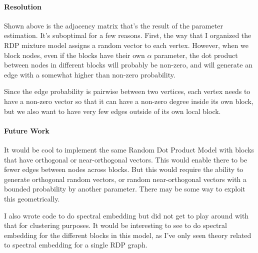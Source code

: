 \documentclass[12pt]{article}
\begin{document}
\paragraph{Resolution}
Shown above is the adjacency matrix that's the result of the parameter
estimation.  It's suboptimal for a few reasons.  First, the way that I organized
the RDP mixture model assigns a random vector to each vertex.  However, when we
block nodes, even if the blocks have their own $\alpha$ parameter, the dot
product between nodes in different blocks will probably be non-zero, and will
generate an edge with a somewhat higher than non-zero probability.

Since the edge probability is pairwise between two vertices, each vertex needs
to have a non-zero vector so that it can have a non-zero degree inside its own
block, but we also want to have very few edges outside of its own local block.

\paragraph{Future Work}
It would be cool to implement the same Random Dot Product Model with blocks that
have orthogonal or near-orthogonal vectors.  This would enable there to be fewer
edges between nodes across blocks.  But this would require the ability to
generate orthogonal random vectors, or random near-orthogonal vectors with a
bounded probability by another parameter.  There may be some way to exploit this
geometrically.

I also wrote code to do spectral embedding but did not get to play around with
that for clustering purposes.  It would be interesting to see to do spectral
embedding for the different blocks in this model, as I've only seen theory
related to spectral embedding for a single RDP graph.

\newpage



\end{document}
